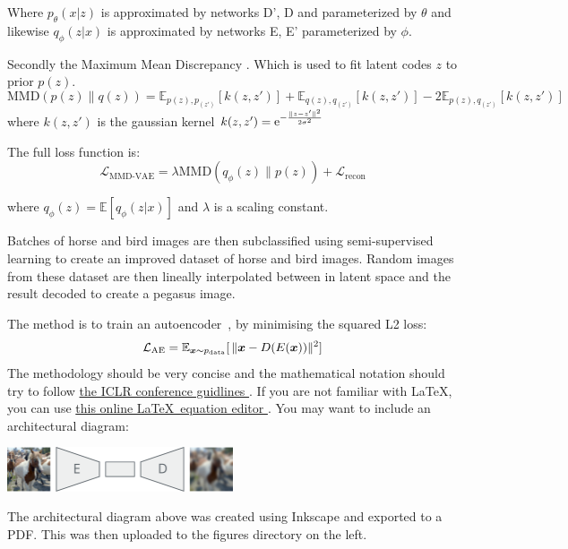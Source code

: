 \documentclass{article}
\begin{document}
Where $p_\theta(x|z)$ is approximated by networks D', D and parameterized by $\theta$ and likewise $q_\phi(z|x)$ is approximated by networks E, E' parameterized by $\phi$.


Secondly the Maximum Mean Discrepancy \cite{mmd}. Which is used to fit latent codes $z$ to prior $p(z)$.
\begin{equation}
    \textrm{MMD}(p(z) \lVert q(z)) = \mathbb{E}_{p(z), p_(z')}[k(z, z')] + \mathbb{E}_{q(z), q_(z')}[k(z, z')] - 2 \mathbb{E}_{p(z), q_(z')}[k(z, z')]
\end{equation}
where $k(z, z')$ is the gaussian kernel $k(z, z')={\rm e}^{-\frac{\lVert z-z' \rVert^2}{2\sigma^2}}$

The full loss function is:
\begin{equation}
    \mathcal{L}_\textrm{MMD-VAE} = \lambda \textrm{MMD}(q_\phi (z) \lVert p(z)) + \mathcal{L}_{\textrm{recon}}
\end{equation}

where $q_\phi(z) =  \mathbb{E}[q_\phi(z|x)]$ and $\lambda$ is a scaling constant.

Batches of horse and bird images are then subclassified using semi-supervised learning to create an improved dataset of horse and bird images. Random images from these dataset are then lineally interpolated between in latent space and the result decoded to create a pegasus image. 



The method is to train an autoencoder~\cite{kramer1991nonlinear}, by minimising the squared L2 loss:
\begin{equation}
    \mathcal{L}_{\textrm{AE}} = \mathbb{E}_{{\bm{x}}\sim p_{\textrm{data}}}[\, \lVert {\bm{x}} - D(E({\bm{x}})) \rVert^2 ]
\end{equation}
The methodology should be very concise and the mathematical notation should try to follow \href{https://v1.overleaf.com/latex/templates/template-for-iclr-2021-conference-submission/mmpfhsxmqdkp.pdf}{the ICLR conference guidlines \faExternalLink}. If you are not familiar with \LaTeX, you can use \href{https://www.codecogs.com/latex/eqneditor.php}{this online \LaTeX~equation editor \faExternalLink}. You may want to include an architectural diagram:
\begin{center}
    \includegraphics[width=0.5\textwidth]{figures/architecture.pdf}
\end{center}
The architectural diagram above was created using Inkscape and exported to a PDF. This was then uploaded to the figures directory on the left.
\end{document}
